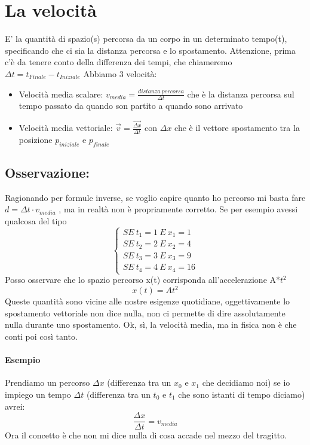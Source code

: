 \documentclass[12pt, a4paper, openany, oneside]{book}
\begin{document}
\section{La velocità}
E' la quantità di spazio(s) percorsa da un corpo in un determinato tempo(t),
specificando che ci sia la distanza percorsa e lo spostamento.
\newline \newline
Attenzione, prima c'è da tenere conto della differenza dei tempi, che chiameremo 
$\Delta t = t_{Finale} - t_{Iniziale}$
\newline
Abbiamo 3 velocità:
\begin{itemize}
	\item {Velocità media scalare: $v_{media} = \frac{distanza~percorsa}{\Delta
	t}$ che è la distanza percorsa sul tempo passato da quando son partito a 
	quando sono arrivato }
	\item {Velocità media vettoriale: $\vec{v} = \frac{\vec{\Delta x}}
	{\Delta t}$ con $\Delta x$ che è il vettore spostamento tra la posizione 
	$p_{iniziale}$ e $p_{finale}$ }
\end{itemize}
\subsection*{Osservazione:}
Ragionando per formule inverse, se voglio capire quanto ho percorso mi basta 
fare $d = \Delta t \cdot v_{media}$ , ma in realtà non è propriamente corretto. 
\newline \newline
Se per esempio avessi qualcosa del tipo
$$
\begin{cases}
SE ~ t_{1} = 1 ~ E ~ x_{1} = 1  \\ 
SE ~ t_{2} = 2 ~ E ~ x_{2} = 4  \\ 
SE ~ t_{3} = 3 ~ E ~ x_{3} = 9  \\
SE ~ t_{4} = 4 ~ E ~ x_{4} = 16 
\end{cases}$$
Posso osservare che lo spazio percorso x(t) corrisponda all'accelerazione A*$t^{2}$
$$x(t) = At^{2}$$
Queste quantità sono vicine alle nostre esigenze quotidiane, oggettivamente lo
spostamento vettoriale non dice nulla, non ci permette di dire assolutamente
nulla durante uno spostamento. Ok, sì, la velocità media, ma in fisica non è che
conti poi così tanto.
\paragraph{Esempio}	
Prendiamo un percorso $\Delta x$ (differenza tra un $x_{0} $ e $x_{1}$ che
decidiamo noi) se io impiego un tempo $\Delta t$ (differenza tra un $t_{0} $ e 
$t_{1}$ che sono istanti di tempo diciamo) avrei: $$\frac{\Delta x}{\Delta t} 
= v_{media}$$ Ora il concetto è che non mi dice nulla di cosa accade nel mezzo
del tragitto. 
\end{document}
